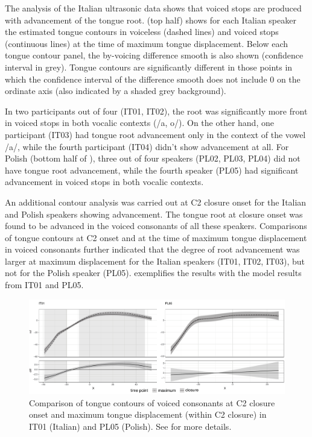 \documentclass[authoryear, twocolumn]{elsarticle}
\begin{document}
The analysis of the Italian ultrasonic data shows that voiced stops are
produced with advancement of the tongue root.  (top half)
shows for each Italian speaker the estimated tongue contours in
voiceless (dashed lines) and voiced stops (continuous lines) at the time
of maximum tongue displacement. Below each tongue contour panel, the
by-voicing difference smooth is also shown (confidence interval in
grey). Tongue contours are significantly different in those points in
which the confidence interval of the difference smooth does not include
0 on the ordinate axis (also indicated by a shaded grey background).

In two participants out of four (IT01, IT02), the root was significantly
more front in voiced stops in both vocalic contexts (/a, o/). On the
other hand, one participant (IT03) had tongue root advancement only in
the context of the vowel /a/, while the fourth participant (IT04) didn't
show advancement at all. For Polish (bottom half of ), three
out of four speakers (PL02, PL03, PL04) did not have tongue root
advancement, while the fourth speaker (PL05) had significant advancement
in voiced stops in both vocalic contexts.

An additional contour analysis was carried out at C2 closure onset for
the Italian and Polish speakers showing advancement. The tongue root at
closure onset was found to be advanced in the voiced consonants of all
these speakers. Comparisons of tongue contours at C2 onset and at the
time of maximum tongue displacement in voiced consonants further
indicated that the degree of root advancement was larger at maximum
displacement for the Italian speakers (IT01, IT02, IT03), but not for
the Polish speaker (PL05).  exemplifies the results with
the model results from IT01 and PL05.

\begin{figure}
    \centering
    \includegraphics[width=.9\textwidth]{fig/voiced.pdf}
    \caption{Comparison of tongue contours of voiced consonants at C2 closure onset and maximum tongue displacement (within C2 closure) in IT01 (Italian) and PL05 (Polish). See  for more details.}
    \label{f:voiced}
\end{figure}
\end{document}
